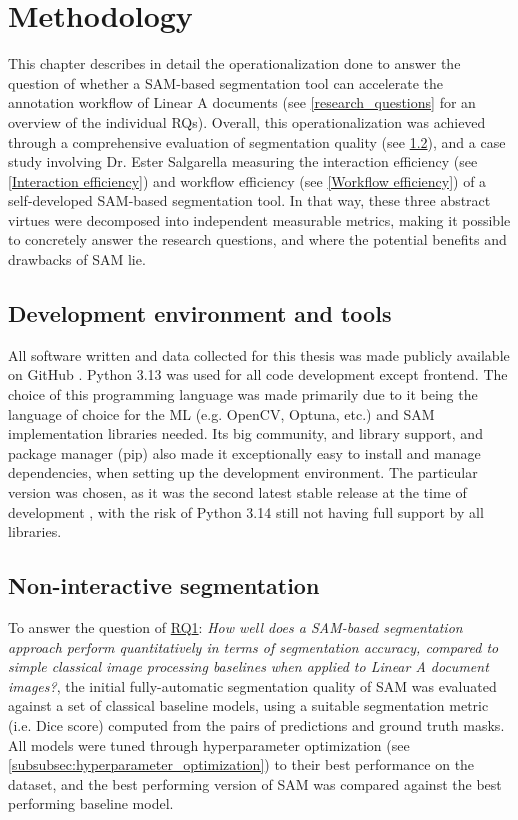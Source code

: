 \chapter{Methodology}
This chapter describes in detail the operationalization done to answer the question of whether a \acs{SAM}-based segmentation tool can accelerate the annotation workflow of Linear A documents (see \cref{research_questions} for an overview of the individual \acsp{RQ}).
Overall, this operationalization was achieved through a comprehensive evaluation of segmentation quality (see \cref{Segmentation quality}), and a case study involving Dr. Ester Salgarella measuring the interaction efficiency (see \cref{Interaction efficiency}) and workflow efficiency (see \cref{Workflow efficiency}) of a self-developed \acs{SAM}-based segmentation tool.
In that way, these three abstract virtues were decomposed into independent measurable metrics, making it possible to concretely answer the research questions, and where the potential benefits and drawbacks of \acs{SAM} lie.
\section{Development environment and tools}

All software written and data collected for this thesis was made publicly available on GitHub \parencite{source_code}.
Python 3.13 was used for all code development except frontend.
The choice of this programming language was made primarily due to it being the language of choice for the \acs{ML} (e.g. OpenCV, Optuna, etc.) and \acs{SAM} implementation libraries needed.
Its big community, and library support, and package manager (pip) also made it exceptionally easy to install and manage dependencies, when setting up the development environment.
The particular version was chosen, as it was the second latest stable release at the time of development \parencite{python313release}, with the risk of Python 3.14 still not having full support by all libraries.

\section{Non-interactive segmentation} \label{Segmentation quality}
To answer the question of \hyperref[rq1]{\acs{RQ}1}: \textit{How well does a \acs{SAM}-based segmentation approach perform quantitatively in terms of segmentation accuracy, compared to simple classical image processing baselines when applied to Linear A document images?}, the initial fully-automatic segmentation quality of \acs{SAM} was evaluated against a set of classical baseline models, using a suitable segmentation metric (i.e. \acs{Dice} score) computed from the pairs of predictions and ground truth masks.
All models were tuned through hyperparameter optimization (see \cref{subsubsec:hyperparameter_optimization}) to their best performance on the dataset, and the best performing version of \acs{SAM} was compared against the best performing baseline model.


